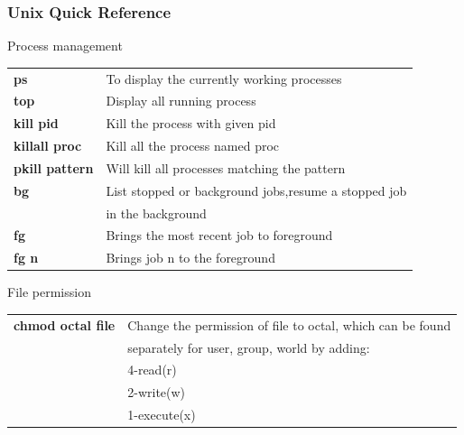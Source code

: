 \documentclass[10pt, hyperref={unicode=true,pdfusetitle, bookmarks=true,bookmarksnumbered=false,bookmarksopen=false, breaklinks=false,pdfborder={0 0l 1},backref=true,colorlinks=true,linkcolor=darkblue,pageanchor}]{beamer}
\begin{document}
\begin{frame}
\frametitle{Unix Quick Reference}

\begin{block}{Process management}
\begin{tabular}{ll}
\textbf{ps}             & To display the currently working processes                              \tabularnewline
\textbf{top}            & Display all running process                                             \tabularnewline
\textbf{kill pid}       & Kill the process with given pid                                         \tabularnewline
\textbf{killall proc}   & Kill all the process named proc                                         \tabularnewline
\textbf{pkill pattern}  & Will kill all processes matching the pattern                            \tabularnewline
\textbf{bg}             & List stopped or background jobs,resume a stopped job                    \tabularnewline
                        & in the background                                                       \tabularnewline
\textbf{fg}             & Brings the most recent job to foreground                                \tabularnewline
\textbf{fg n}           & Brings job n to the foreground                                          \tabularnewline
\end{tabular}
\end{block}

\begin{block}{File permission}
\begin{tabular}{ll}
\textbf{chmod octal file}      & Change the permission of file to octal, which can be found \tabularnewline
                               & separately for user, group, world by adding:               \tabularnewline
 & 4-read(r)    \tabularnewline
 & 2-write(w)   \tabularnewline
 & 1-execute(x) \tabularnewline
\end{tabular}
\end{block}

\end{frame}
\end{document}
